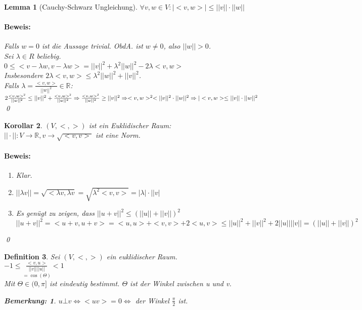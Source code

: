 \documentclass{report}
\newcommand{\lb}{\lambda}
\newcommand{\R}{\mathbb{R}}
\theoremstyle{customrem}
\newtheorem*{bemerkung}{Bemerkung\textnormal:}
\theoremstyle{customdef}
\newtheorem{definition}{Definition}[chapter]
\newtheorem{lemma}[definition]{Lemma}
\newtheorem{korrolar}[definition]{Korollar}
\renewenvironment{proof}{\paragraph{Beweis: }}{\qed}
\theoremstyle{customenv}
\begin{document}
\begin{lemma}[Cauchy-Schwarz Ungleichung]
  \(\forall v, w \in V: |<v, w>| \le ||v|| \cdot ||w||\)
  \begin{proof}
    Falls \(w = 0\) ist die Aussage trivial. ObdA. ist \(w \neq 0\), also
    \(||w|| > 0\).\\
    Sei \(\lb \in R\) beliebig.\\
    \(
    0 \le <v - \lb w, v - \lb w> = ||v||^2 + \lb^2 ||w||^2 - 2 \lb <v, w>
    \)\\
    Insbesondere \(2\lb <v, w> \le \lb^2 ||w||^2 + ||v||^2\).\\
    Falls \(\lb = \frac{<v, w>}{||w||^2} \in \R\):\\
    \(2 \frac{<v, w>^2}{||w||^2} \le ||v||^2 + \frac{<v, w>^2}{||w||^2}\\
    \Rightarrow \frac{<v, w>^2}{||w||^2} \ge ||v||^2
    \Rightarrow <v, w>^2 < ||v||^2 \cdot ||w||^2\\
    \Rightarrow |<v, w> \le ||v|| \cdot ||w||^2
    \)
  \end{proof}
\end{lemma}

\begin{korrolar}
  \((V, <, >)\) ist ein Euklidischer Raum:\\
  \(||\cdot|| : V \to \R, v \to \sqrt{<v, v>}\) ist eine Norm.
  \begin{proof}
  \begin{enumerate}
    \item {
      Klar.
    }
    \item {
      \(||\lb v|| = \sqrt{<\lb v, \lb v} = \sqrt{\lb^2 <v, v>}
      = |\lb| \cdot ||v|\)
    }
    \item {
      Es gen\"ugt zu zeigen, dass \(||u+v||^2 \le (||u|| + ||v||)^2\)\\
      \(
      ||u+v||^2 = <u+v, u + v>
      = <u,u> + <v,v>+ 2 <u,v>
      \le ||u||^2 + ||v||^2 + 2 ||u|| ||v||
      = (||u|| + ||v||)^2
      \)
    }
  \end{enumerate}
  \end{proof}
\end{korrolar}

\begin{definition}
  Sei \((V, <, >)\) ein euklidischer Raum.\\
  \(-1 \le \underset{=\cos(\Theta)}{\frac{<v, u>}{||v|| ||u||}} < 1\)\\
  Mit \(\Theta \in (0, \pi]\) ist eindeutig bestimmt. \(\Theta\) ist der Winkel
  zwischen u und v.\\
  \begin{bemerkung}
    \(u \bot v
    \Leftrightarrow <u v> = 0
    \Leftrightarrow\) der Winkel \(\frac{\pi}{2}\) ist.
  \end{bemerkung}
\end{definition}
\end{document}
